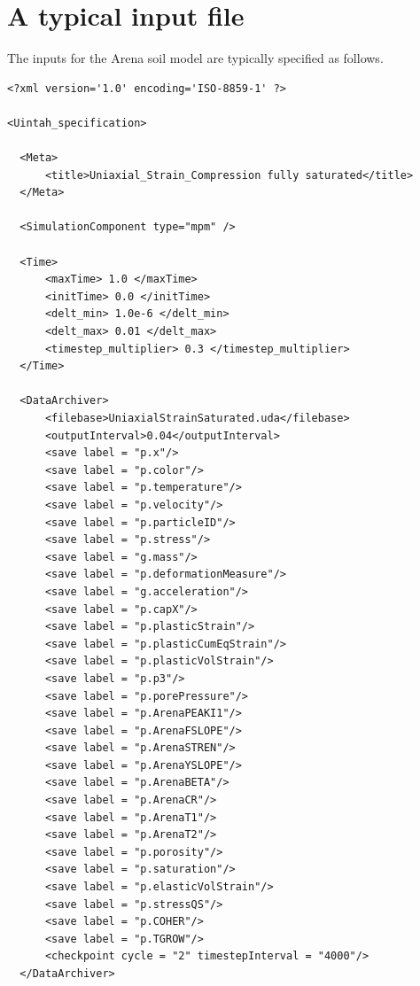 \documentclass[11pt,a4paper]{article}
\begin{document}
\section{A typical input file}
The inputs for the Arena soil model are typically specified as follows.
\lstset{
  language=XML
}
\begin{lstlisting}
<?xml version='1.0' encoding='ISO-8859-1' ?>

<Uintah_specification>

  <Meta>
      <title>Uniaxial_Strain_Compression fully saturated</title>
  </Meta>

  <SimulationComponent type="mpm" />

  <Time>
      <maxTime> 1.0 </maxTime>
      <initTime> 0.0 </initTime>
      <delt_min> 1.0e-6 </delt_min>
      <delt_max> 0.01 </delt_max>
      <timestep_multiplier> 0.3 </timestep_multiplier>
  </Time>

  <DataArchiver>
      <filebase>UniaxialStrainSaturated.uda</filebase>
      <outputInterval>0.04</outputInterval>
      <save label = "p.x"/>
      <save label = "p.color"/>
      <save label = "p.temperature"/>
      <save label = "p.velocity"/>
      <save label = "p.particleID"/>
      <save label = "p.stress"/>
      <save label = "g.mass"/>
      <save label = "p.deformationMeasure"/>
      <save label = "g.acceleration"/>
      <save label = "p.capX"/>
      <save label = "p.plasticStrain"/>
      <save label = "p.plasticCumEqStrain"/>
      <save label = "p.plasticVolStrain"/>
      <save label = "p.p3"/>
      <save label = "p.porePressure"/>
      <save label = "p.ArenaPEAKI1"/>
      <save label = "p.ArenaFSLOPE"/>
      <save label = "p.ArenaSTREN"/>
      <save label = "p.ArenaYSLOPE"/>
      <save label = "p.ArenaBETA"/>
      <save label = "p.ArenaCR"/>
      <save label = "p.ArenaT1"/>
      <save label = "p.ArenaT2"/>
      <save label = "p.porosity"/>
      <save label = "p.saturation"/>
      <save label = "p.elasticVolStrain"/>
      <save label = "p.stressQS"/>
      <save label = "p.COHER"/>
      <save label = "p.TGROW"/>
      <checkpoint cycle = "2" timestepInterval = "4000"/>
  </DataArchiver>


\end{lstlisting}
\end{document}
